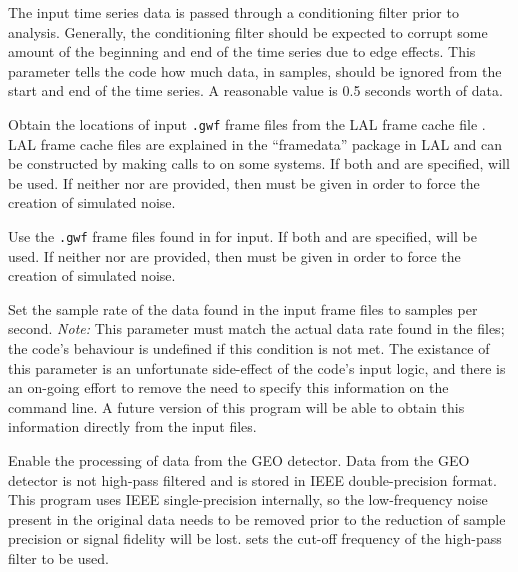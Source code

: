 \begin{entry}
\begin{entry}
\item[\option{--filter-corruption} \parm{samples}]
The input time series data is passed through a conditioning filter prior to
analysis.  Generally, the conditioning filter should be expected to corrupt
some amount of the beginning and end of the time series due to edge
effects.  This parameter tells the code how much data, in samples, should
be ignored from the start and end of the time series.  A reasonable value
is 0.5 seconds worth of data.

\item[\option{--frame-cache} \parm{cache file}]
Obtain the locations of input \texttt{.gwf} frame files from the LAL frame
cache file .  LAL frame cache files are explained in the
``framedata'' package in LAL and can be constructed by making calls to
 on some systems.  If both  and
 are specified,  will be used.  If
neither  nor  are provided, then
 must be given in order to force the creation of
simulated noise.

\item[\option{--frame-dir} \parm{directory}]
Use the \texttt{.gwf} frame files found in  for input.  If
both  and  are specified,
 will be used.  If neither  nor
 are provided, then  must be
given in order to force the creation of simulated noise.

\item[\option{--frame-sample-rate} \parm{Hz}]
Set the sample rate of the data found in the input frame files to 
samples per second.  \emph{Note:} This parameter must match the actual data
rate found in the files;  the code's behaviour is undefined if this
condition is not met.  The existance of this parameter is an unfortunate
side-effect of the code's input logic, and there is an on-going effort to
remove the need to specify this information on the command line.  A future
version of this program will be able to obtain this information directly
from the input files.

\item[\option{--geodata} \parm{high pass corner frequency}]
Enable the processing of data from the GEO detector.  Data from the GEO
detector is not high-pass filtered and is stored in IEEE double-precision
format.  This program uses IEEE single-precision internally, so the
low-frequency noise present in the original data needs to be removed prior
to the reduction of sample precision or signal fidelity will be lost.
 sets the cut-off frequency of the
high-pass filter to be used.


\end{entry}
\end{entry}
